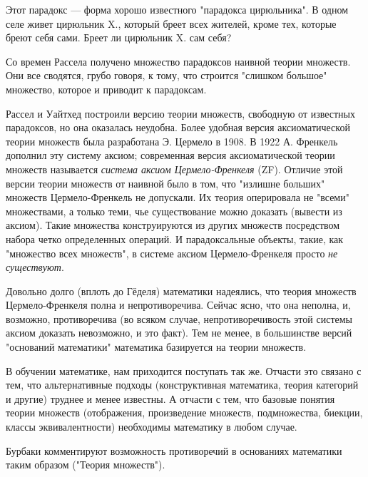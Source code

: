 \documentclass[12pt]{book}
\theoremstyle{upshape}
\theoremstyle{generic}
\def\еза{\end{remark}}
\theoremstyle{upshapenonumber}
\newcommand{\следствие}{%
     \refstepcounter{teorema}
     {\noindent\bf Следствие \thechapter.\arabic{teorema}:\ }}
\newcommand{\пример}{%
     \refstepcounter{teorema}
     {\noindent\bf Пример \thechapter.\arabic{teorema}:\ }}
\newcommand{\лемма}{%
     \refstepcounter{teorema}
     {\noindent\bf Лемма \thechapter.\arabic{teorema}:\ }}
\newcommand{\теорема}{%
     \refstepcounter{teorema}
     {\noindent\bf Теорема \thechapter.\arabic{teorema}:\ }}
\newcommand{\утверждение}{%
     \refstepcounter{teorema}
     {\noindent\bf Утверждение \thechapter.\arabic{teorema}:\ }}
\def\ем{\em}
\def\ез{\end{zadacha}}
\def\еу{\end{ukazanie}}
\def\ео{\end{opredelenie}}
\def\енум{\begin{enumerate}}
\def\ее{\end{enumerate}}
\begin{document}
Этот парадокс --- форма хорошо известного
"парадокса цирюльника". В одном селе живет цирюльник X.,
который бреет всех жителей, кроме тех, которые бреют себя сами.
Бреет ли цирюльник X. сам себя? 

Со времен Рассела получено множество парадоксов
наивной теории множеств. Они все сводятся, грубо говоря,
к тому, что строится "слишком большое" множество,
которое и приводит к парадоксам.

Рассел и Уайтхед построили версию теории множеств, свободную
от известных парадоксов, но она оказалась неудобна.
Более удобная версия
аксиоматической теории множеств была разработана
Э. Цермело в 1908. В 1922 А. Френкель
дополнил эту систему аксиом; современная версия
аксиоматической теории множеств называется
{\ем система аксиом Цермело-Френкеля} (ZF).
Отличие этой версии теории множеств от
наивной было в том, что "излишне больших"
множеств Цермело-Френкель не допускали.
Их теория оперировала не "всеми" множествами,
а только теми, чье существование можно
доказать (вывести из аксиом). Такие множества
конструируются из других множеств посредством
набора четко определенных операций. И парадоксальные
объекты, такие, как "множество всех множеств",
в системе аксиом Цермело-Френкеля просто
{\em не существуют}.

Довольно долго
(вплоть до Гёделя) математики надеялись, 
что теория множеств Цермело-Френкеля полна и непротиворечива.
Сейчас ясно, что она неполна, и, возможно,
противоречива (во всяком случае, непротиворечивость
этой системы аксиом доказать невозможно, и это факт). 
Тем не менее, в большинстве версий "оснований математики"
математика базируется на теории множеств.

В обучении математике, нам приходится поступать 
так же. Отчасти это связано с тем, что альтернативные
подходы (конструктивная математика, теория
категорий и другие) труднее и менее известны.
А отчасти с тем, что базовые понятия 
теории множеств (отображения, произведение множеств,
подмножества, биекции, классы эквивалентности) необходимы
математику в любом случае.

Бурбаки комментируют возможность противоречий в основаниях
математики таким образом ("Теория множеств"). 
\end{document}
